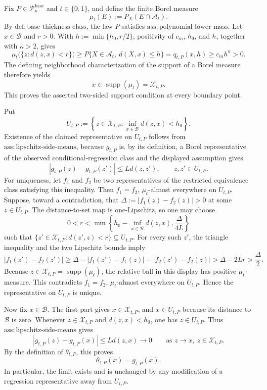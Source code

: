 Fix \(P\in\mathcal P_{\kappa}^{\mathrm{base}}\) and \(t\in\{0,1\}\), and define the finite Borel measure
\[
\mu_t(E):=P_X(E\cap\mathcal A_t).
\]
By \(\mathrm{def:base\text{-}thickness\text{-}class}\), the law \(P\) satisfies \(\mathrm{ass:polynomial\text{-}lower\text{-}mass}\). Let \(x\in\mathcal B\) and \(r>0\). With \(h:=\min\{h_0,r/2\}\), positivity of \(c_m\), \(h_0\), and \(h\), together with \(\kappa>2\), gives
\[
\mu_t\bigl(\{z:d(z,x)<r\}\bigr)
\ge P\{X\in\mathcal A_t,\ d(X,x)\le h\}
=q_{t,P}(x,h)
\ge c_m h^{\kappa}>0.
\]
The defining neighborhood characterization of the support of a Borel measure therefore yields
\[
x\in\operatorname{supp}(\mu_t)=\mathcal X_{t,P}.
\]
This proves the asserted two-sided support condition at every boundary point.

Put
\[
U_{t,P}:=\left\{z\in\mathcal X_{t,P}:\inf_{x\in\mathcal B}d(z,x)<h_0\right\}.
\]
Existence of the claimed representative on \(U_{t,P}\) follows from \(\mathrm{ass:lipschitz\text{-}side\text{-}means}\), because \(g_{t,P}\) is, by its definition, a Borel representative of the observed conditional-regression class and the displayed assumption gives
\[
|g_{t,P}(z)-g_{t,P}(z')|\le Ld(z,z'),\qquad z,z'\in U_{t,P}.
\]
For uniqueness, let \(f_1\) and \(f_2\) be two representatives of the restricted equivalence class satisfying this inequality. Then \(f_1=f_2\), \(\mu_t\)-almost everywhere on \(U_{t,P}\). Suppose, toward a contradiction, that \(\Delta:=|f_1(z)-f_2(z)|>0\) at some \(z\in U_{t,P}\). The distance-to-set map is one-Lipschitz, so one may choose
\[
0<r<\min\left\{h_0-\inf_{x\in\mathcal B}d(z,x),\frac{\Delta}{4L}\right\}
\]
such that \(\{z'\in\mathcal X_{t,P}:d(z',z)<r\}\subseteq U_{t,P}\). For every such \(z'\), the triangle inequality and the two Lipschitz bounds imply
\[
|f_1(z')-f_2(z')|
\ge \Delta-|f_1(z')-f_1(z)|-|f_2(z')-f_2(z)|
>\Delta-2Lr
>\frac{\Delta}{2}.
\]
Because \(z\in\mathcal X_{t,P}=\operatorname{supp}(\mu_t)\), the relative ball in this display has positive \(\mu_t\)-measure. This contradicts \(f_1=f_2\), \(\mu_t\)-almost everywhere on \(U_{t,P}\). Hence the representative on \(U_{t,P}\) is unique.

Now fix \(x\in\mathcal B\). The first part gives \(x\in\mathcal X_{t,P}\), and \(x\in U_{t,P}\) because its distance to \(\mathcal B\) is zero. Whenever \(z\in\mathcal X_{t,P}\) and \(d(z,x)<h_0\), one has \(z\in U_{t,P}\). Thus \(\mathrm{ass:lipschitz\text{-}side\text{-}means}\) gives
\[
|g_{t,P}(z)-g_{t,P}(x)|\le Ld(z,x)\longrightarrow0
\qquad\text{as }z\to x,\ z\in\mathcal X_{t,P}.
\]
By the definition of \(\theta_{t,P}\), this proves
\[
\theta_{t,P}(x)=g_{t,P}(x).
\]
In particular, the limit exists and is unchanged by any modification of a regression representative away from \(U_{t,P}\).

